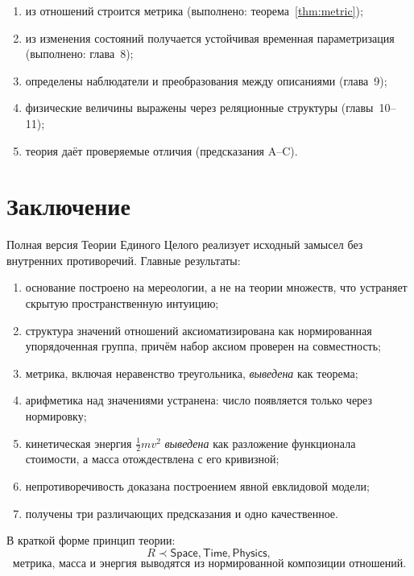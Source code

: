 \documentclass[12pt,a4paper,oneside]{book}
\theoremstyle{definition}
\theoremstyle{plain}
\theoremstyle{remark}
\newcommand{\Rel}{R}
\newcommand{\Space}{\mathsf{Space}}
\newcommand{\Time}{\mathsf{Time}}
\newcommand{\Physics}{\mathsf{Physics}}
\begin{document}
\begin{enumerate}
    \item из отношений строится метрика (выполнено: теорема~\ref{thm:metric});
    \item из изменения состояний получается устойчивая временная параметризация
    (выполнено: глава~8);
    \item определены наблюдатели и преобразования между описаниями (глава~9);
    \item физические величины выражены через реляционные структуры (главы~10--11);
    \item теория даёт проверяемые отличия (предсказания A--C).
\end{enumerate}

\chapter{Заключение}

Полная версия Теории Единого Целого реализует исходный замысел без внутренних
противоречий. Главные результаты:

\begin{enumerate}
    \item основание построено на мереологии, а не на теории множеств, что устраняет
    скрытую пространственную интуицию;
    \item структура значений отношений аксиоматизирована как нормированная
    упорядоченная группа, причём набор аксиом проверен на совместность;
    \item метрика, включая неравенство треугольника, \emph{выведена} как теорема;
    \item арифметика над значениями устранена: число появляется только через
    нормировку;
    \item кинетическая энергия $\tfrac12 mv^2$ \emph{выведена} как разложение
    функционала стоимости, а масса отождествлена с его кривизной;
    \item непротиворечивость доказана построением явной евклидовой модели;
    \item получены три различающих предсказания и одно качественное.
\end{enumerate}

В краткой форме принцип теории:
\[
\boxed{\Rel\prec\Space,\Time,\Physics,}
\]
\[
\boxed{\text{метрика, масса и энергия выводятся из нормированной композиции отношений.}}
\]
\end{document}
